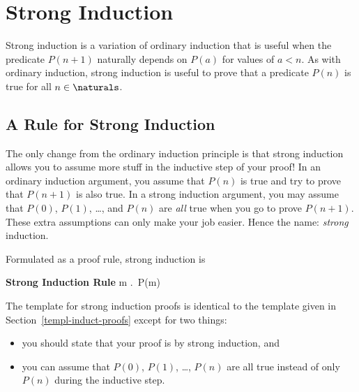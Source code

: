 
\section{Strong Induction}\label{sec:strong-induction}

Strong induction is a variation of ordinary induction that is useful
when the predicate $P(n+1)$ naturally depends on $P(a)$ for values of
$a < n$.  As with ordinary induction, strong induction is useful to
prove that a predicate $P(n)$ is true for all $n \in \naturals$.

\subsection{A Rule for Strong Induction}


The only change from the ordinary induction principle is that strong
induction allows you to assume more stuff in the inductive step of your
proof!  In an ordinary induction argument, you assume that $P(n)$ is true
and try to prove that $P(n+1)$ is also true.  In a strong induction
argument, you may assume that $P(0)$, $P(1)$, \dots, and $P(n)$ are
\emph{all} true when you go to prove $P(n+1)$.  These extra assumptions
can only make your job easier.  Hence the name: \emph{strong}
induction.

Formulated as a proof rule, strong induction is
\begin{rul*} \textbf{Strong Induction Rule}
\Rule{P(0), \quad \forall n \in \naturals. \;
    \bigl(P(0) \land P(1) \land \dots \land P(m) \bigr) \QIMPLIES P(n+1)]}
{\forall m \in \naturals.\, P(m)}
\end{rul*}

The template for strong induction proofs is identical to the template
given in Section~\ref{templ-induct-proofs} except for two things:
\begin{itemize}

\item
you should state that your proof is by strong induction, and

\item
you can assume that $P(0)$, $P(1)$, \dots, $P(n)$ are all true instead
of only $P(n)$ during the inductive step.

\end{itemize}

